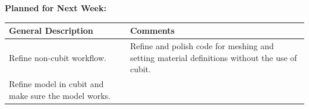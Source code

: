 \documentclass{article}
\begin{document}
\textbf{Planned for Next Week: }

\renewcommand{\arraystretch}{1.5}
\begin{table}[H]
    \centering
    \begin{tabularx}{0.95\textwidth} { 
        | >{\centering\arraybackslash}X
        | >{\centering\arraybackslash}X | }

    \hline
    \textbf{General Description} & \textbf{Comments} \\
    \hline
    Refine non-cubit workflow. & Refine and polish code for meshing and setting material definitions without the use of cubit. \\
    \hline
    Refine model in cubit and make sure the model works.
    \end{tabularx}
\end{table}
\end{document}
